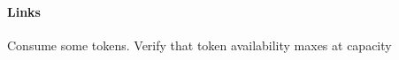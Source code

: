 \label{TC-202}
\paragraph{Links} 

\begin{testprocedure}
    \stage Consume some tokens.
    \stage Verify that token availability maxes at capacity
\end{testprocedure}
